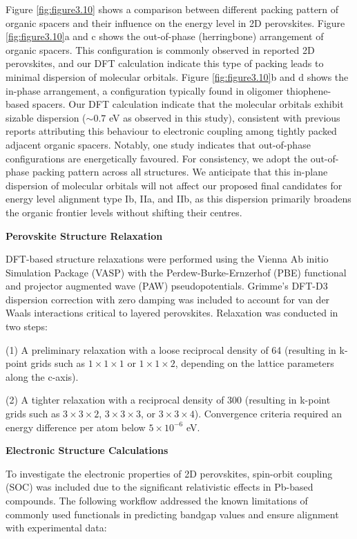 Figure \ref{fig:figure3.10} shows a comparison between different packing pattern of organic spacers and their influence on the energy level in 2D perovskites. Figure \ref{fig:figure3.10}a and c shows the out-of-phase (herringbone) arrangement of organic spacers. This configuration is commonly observed in reported 2D perovskites, and our DFT calculation indicate this type of packing leads to minimal dispersion of molecular orbitals. Figure \ref{fig:figure3.10}b and d shows the in-phase arrangement, a configuration typically found in oligomer thiophene-based spacers. Our DFT calculation indicate that the molecular orbitals exhibit sizable dispersion ($\sim0.7$ eV as observed in this study), consistent with previous reports attributing this behaviour to electronic coupling among tightly packed adjacent organic spacers\cite{RN2}. Notably, one study indicates that out-of-phase configurations are energetically favoured\cite{RN41}. For consistency, we adopt the out-of-phase packing pattern across all structures. We anticipate that this in-plane dispersion of molecular orbitals will not affect our proposed final candidates for energy level alignment type Ib, IIa, and IIb, as this dispersion primarily broadens the organic frontier levels without shifting their centres.

\textbf{Perovskite Structure Relaxation}

DFT-based structure relaxations were performed using the Vienna Ab initio Simulation Package (VASP) with the Perdew-Burke-Ernzerhof (PBE) functional and projector augmented wave (PAW) pseudopotentials. Grimme’s DFT-D3 dispersion correction with zero damping was included to account for van der Waals interactions critical to layered perovskites. Relaxation was conducted in two steps: 

(1) A preliminary relaxation with a loose reciprocal density of 64 (resulting in k-point grids such as $1\times1\times1$ or $1\times1\times2$, depending on the lattice parameters along the c-axis). 

(2) A tighter relaxation with a reciprocal density of 300 (resulting in k-point grids such as $3\times3\times2$, $3\times3\times3$, or $3\times3\times4$). Convergence criteria required an energy difference per atom below $5\times10^{-6}$ eV.

\textbf{Electronic Structure Calculations}



To investigate the electronic properties of 2D perovskites, spin-orbit coupling (SOC) was included due to the significant relativistic effects in Pb-based compounds. The following workflow addressed the known limitations of commonly used functionals in predicting bandgap values and ensure alignment with experimental data: 

